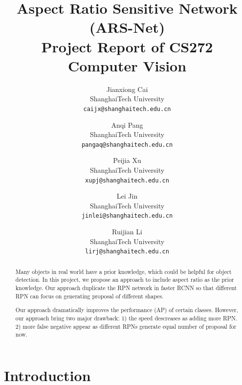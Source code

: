 \documentclass[10pt,twocolumn,letterpaper]{article}
\begin{document}
\title{Aspect Ratio Sensitive Network (ARS-Net) \\ 
\small Project Report of CS272 Computer Vision
}

\author{Jianxiong Cai\\
ShanghaiTech University\\
{\tt\small caijx@shanghaitech.edu.cn}
\and
Anqi Pang\\
ShanghaiTech University\\
{\tt\small pangaq@shanghaitech.edu.cn}
\and
Peijia Xu\\
ShanghaiTech University\\
{\tt\small xupj@shanghaitech.edu.cn}
\and
Lei Jin\\
ShanghaiTech University\\
{\tt\small jinlei@shanghaitech.edu.cn}
\and
Ruijian Li\\
ShanghaiTech University\\
{\tt\small lirj@shanghaitech.edu.cn}
}


\maketitle

\begin{abstract}
\par
Many objects in real world have a prior knowledge, which could be helpful for object detection. In this project, we propose an approach to include aspect ratio as the prior knowledge. Our approach duplicate the RPN network in faster RCNN \cite{fasterRCNN} so that different RPN can focus on generating proposal of different shapes.
\par
Our approach dramatically improves the performance (AP) of certain classes. However, our approach bring two major drawback: 1) the speed descreases as adding more RPN. 2) more false negative appear as different RPNs generate equal number of proposal for now.

\end{abstract}

\section{Introduction}
\par
\end{document}
